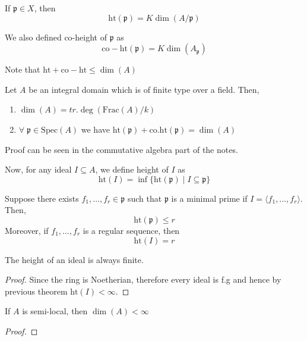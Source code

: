 \documentclass[oneside, 12pt]{scrbook}
\newcommand{\spec}{\mathrm{Spec}}
\newcommand{\pr}{\mathfrak{p}}
\newcommand{\Ht}{\mathrm{ht}}
\newcommand{\coht}{\mathrm{co.ht}}
\theoremstyle{theorem}
\begin{document}
If $\pr \in X$, then $$\mathrm{ht} (\pr) = K \dim (A/{\pr})$$

We also defined co-height of $\pr $ as $$ \mathrm{co-ht}(\pr)= K \dim (A_{\pr})$$ 

Note that $\mathrm{ht} + \mathrm{co-ht} \le \dim (A)$

\begin{theorem}
Let $A$ be an integral domain which is of finite type over a field. Then, 
\begin{enumerate}
\item $\dim (A) = tr.\deg(\mathrm{Frac}(A)/k)$
\item $\forall \; \pr \in \spec(A)$ we have $\Ht(\pr) + \coht(\pr) = \dim (A)$
\end{enumerate}
\end{theorem}

Proof can be seen in the commutative algebra part of the notes.

Now, for any ideal $I \subseteq A$, we define height of $I$ as 
\begin{equation*}
\Ht(I) = \inf \{ \Ht(\pr)\mid I \subseteq \pr \}
\end{equation*}

\begin{theorem}
Suppose there exists $f_{1},\hdots , f_{r} \in \pr$ such that $\pr$ is a minimal prime if $I = \langle f_{1} , \hdots , f_{r}\rangle$. Then, 
\begin{equation}
\Ht(\pr) \le r 
\end{equation}
Moreover, if $f_{1}, \hdots , f_{r}$ is a regular sequence, then 
\begin{equation}
\Ht(I) = r
\end{equation}
\end{theorem}

\begin{corollary}
The height of an ideal is always finite.
\end{corollary}

\begin{proof}
Since the ring is Noetherian, therefore every ideal is f.g and hence by previous theorem $\Ht(I) < \infty$.
\end{proof}

\begin{corollary}
If $A$ is semi-local, then $\dim (A)< \infty$
\end{corollary}

\begin{proof}

\end{proof}
\end{document}

